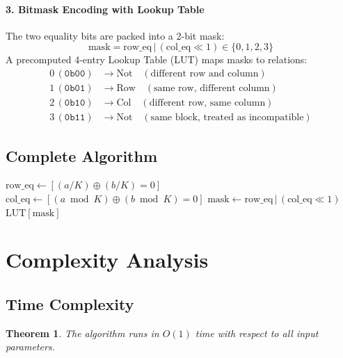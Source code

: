 \documentclass[11pt,a4paper]{article}
\newtheorem{theorem}{Theorem}
\begin{document}
\paragraph{3. Bitmask Encoding with Lookup Table}
The two equality bits are packed into a 2-bit mask:
\begin{equation}
    \text{mask} = \text{row\_eq} \,|\, (\text{col\_eq} \ll 1) \in \{0, 1, 2, 3\}
\end{equation}
A precomputed 4-entry Lookup Table (LUT) maps masks to relations:
\begin{align*}
    0\,(\texttt{0b00}) &\to \text{Not} \quad (\text{different row and column}) \\
    1\,(\texttt{0b01}) &\to \text{Row} \quad (\text{same row, different column}) \\
    2\,(\texttt{0b10}) &\to \text{Col} \quad (\text{different row, same column}) \\
    3\,(\texttt{0b11}) &\to \text{Not} \quad (\text{same block, treated as incompatible})
\end{align*}

\subsection{Complete Algorithm}

\begin{algorithm}[H]
\caption{Minigrid Relationship Determination}
\begin{algorithmic}[1]
    \State $\text{row\_eq} \gets [(a / K) \oplus (b / K) = 0]$ 
    \State $\text{col\_eq} \gets [(a \bmod K) \oplus (b \bmod K) = 0]$ 
    \State $\text{mask} \gets \text{row\_eq} \,|\, (\text{col\_eq} \ll 1)$ 
    \State \Return $\text{LUT}[\text{mask}]$ 
\EndFunction
\end{algorithmic}
\end{algorithm}

\section{Complexity Analysis}

\subsection{Time Complexity}

\begin{theorem}
The algorithm runs in $O(1)$ time with respect to all input parameters.
\end{theorem}
\end{document}
